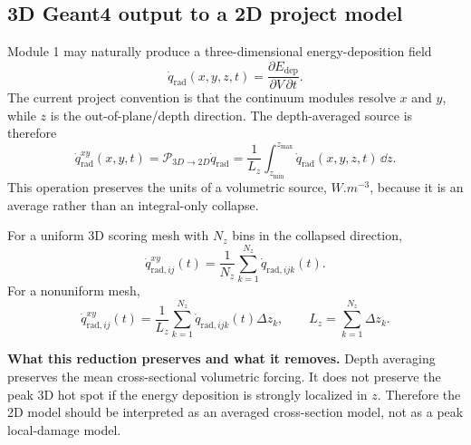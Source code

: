 \documentclass[11pt]{article}
\begin{document}
\subsection{3D Geant4 output to a 2D project model}
Module 1 may naturally produce a three-dimensional energy-deposition field
\begin{equation}
    \dot{q}_{\mathrm{rad}}(x,y,z,t)
    =
    \frac{\partial E_{\mathrm{dep}}}{\partial V\,\partial t}.
    \label{eq:qrad_3d_def}
\end{equation}
The current project convention is that the continuum modules resolve \(x\) and \(y\), while \(z\) is the out-of-plane/depth direction. The depth-averaged source is therefore
\begin{equation}
    \boxed{
    \dot{q}_{\mathrm{rad}}^{xy}(x,y,t)
    =
    \mathcal{P}_{3D\to2D}\dot{q}_{\mathrm{rad}}
    =
    \frac{1}{L_z}
    \int_{z_{\min}}^{z_{\max}}
    \dot{q}_{\mathrm{rad}}(x,y,z,t)\,\dd z.
    }
    \label{eq:depth_average_qrad}
\end{equation}
This operation preserves the units of a volumetric source, \(\si{W.m^{-3}}\), because it is an average rather than an integral-only collapse.

For a uniform 3D scoring mesh with \(N_z\) bins in the collapsed direction,
\begin{equation}
    \boxed{
    \dot{q}_{\mathrm{rad},ij}^{xy}(t)
    =
    \frac{1}{N_z}
    \sum_{k=1}^{N_z}
    \dot{q}_{\mathrm{rad},ijk}(t).
    }
    \label{eq:uniform_depth_average}
\end{equation}
For a nonuniform mesh,
\begin{equation}
    \dot{q}_{\mathrm{rad},ij}^{xy}(t)
    =
    \frac{1}{L_z}
    \sum_{k=1}^{N_z}
    \dot{q}_{\mathrm{rad},ijk}(t)\Delta z_k,
    \qquad
    L_z=\sum_{k=1}^{N_z}\Delta z_k.
    \label{eq:nonuniform_depth_average}
\end{equation}

\begin{notebox}
\textbf{What this reduction preserves and what it removes.} Depth averaging preserves the mean cross-sectional volumetric forcing. It does not preserve the peak 3D hot spot if the energy deposition is strongly localized in \(z\). Therefore the 2D model should be interpreted as an averaged cross-section model, not as a peak local-damage model.
\end{notebox}
\end{document}
